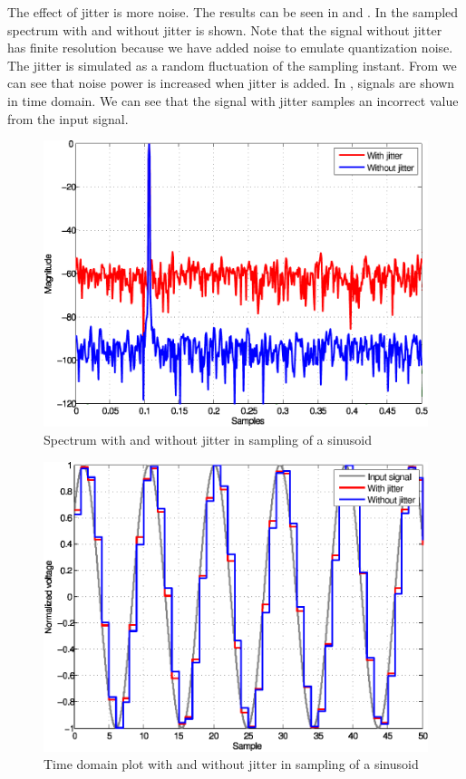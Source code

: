 The effect of jitter is more noise. The results can
be seen in  and . In  the sampled spectrum with and without jitter
is shown. Note that the signal without jitter has finite resolution
because we have added noise to emulate quantization noise. 
The
jitter is simulated as a random fluctuation of the
sampling instant. From 
 we can see that noise power is increased when jitter
is added. In , signals are shown in time
domain. We can see that the signal with jitter samples an incorrect value
from the input signal. 
\begin{figure}[!htb]
\centering 
 \includegraphics[width=\myfigwidth]{graphics/jit_fft}
  \caption{Spectrum with and without jitter in sampling of a sinusoid}
  \label{fig:jit_fft}
\end{figure}

\begin{figure}[!htb]
\centering 
 \includegraphics[width=\myfigwidth]{graphics/jit_time}
  \caption{Time domain plot with and without jitter in sampling of a sinusoid}
  \label{fig:jit_time}
\end{figure}

